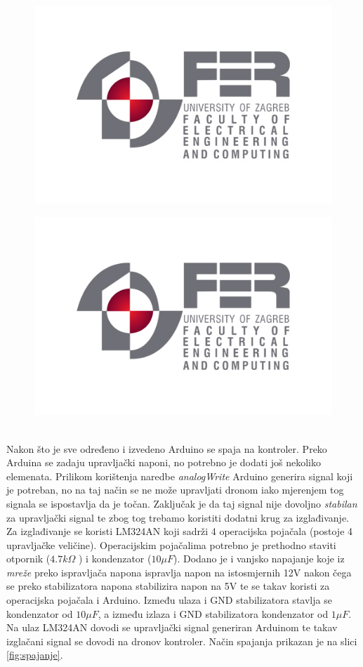 \documentclass[times, utf8, diplomski]{fer}
\begin{document}
\begin{figure}[htb]
\centering
\begin{minipage}{.5\textwidth}
  \centering
  \includegraphics[width=.6\linewidth]{img/fer_logo.jpg}
  \label{fig:kontrolerUnutra}
\end{minipage}%
\begin{minipage}{.5\textwidth}
  \centering
  \includegraphics[width=.6\linewidth]{img/fer_logo.jpg}
  \label{fig:kontrolerVani}
\end{minipage}
\end{figure}\\
Nakon što je sve određeno i izvedeno Arduino se spaja na kontroler. Preko Arduina se zadaju upravljački naponi, no potrebno je dodati još nekoliko elemenata. Prilikom korištenja naredbe \emph{analogWrite} Arduino generira signal koji je potreban, no na taj način se ne može upravljati dronom iako mjerenjem tog signala se ispostavlja da je točan. Zaključak je da taj signal nije dovoljno \emph{stabilan} za upravljački signal te zbog tog trebamo koristiti dodatni krug za izglađivanje. Za izglađivanje se koristi LM324AN koji sadrži 4 operacijska pojačala (postoje 4 upravljačke veličine). Operacijskim pojačalima potrebno je prethodno staviti otpornik ($4.7k\Omega$ ) i kondenzator ($10 \mu F$). Dodano je i vanjsko napajanje koje iz \emph{mreže} preko ispravljača napona ispravlja napon na istosmjernih 12V nakon čega se preko stabilizatora napona stabilizira napon na 5V te se takav koristi za operacijska pojačala i Arduino. Između ulaza i GND stabilizatora stavlja se kondenzator od $10\mu F$, a između izlaza i GND stabilizatora kondenzator od $1\mu F$. Na ulaz LM324AN dovodi se upravljački signal generiran Arduinom te takav izglačani signal se dovodi na dronov kontroler. Način spajanja prikazan je na slici \ref{fig:spajanje}.
\end{document}
